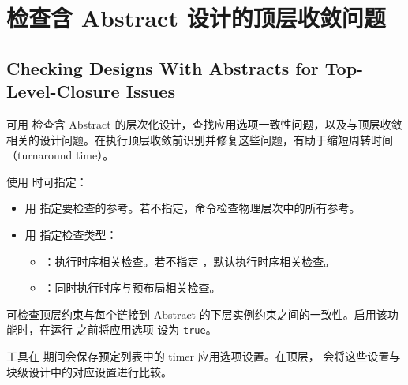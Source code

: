 \section{检查含 Abstract 设计的顶层收敛问题}
\subsection*{Checking Designs With Abstracts for Top-Level-Closure Issues}

可用  检查含 Abstract 的层次化设计，查找应用选项一致性问题，以及与顶层收敛相关的设计问题。在执行顶层收敛前识别并修复这些问题，有助于缩短周转时间（turnaround time）。

使用  时可指定：
\begin{itemize}
  \item 用  指定要检查的参考。若不指定，命令检查物理层次中的所有参考。
  \item 用  指定检查类型：
  \begin{itemize}
    \item {}：执行时序相关检查。若不指定 ，默认执行时序相关检查。
    \item {}：同时执行时序与预布局相关检查。
  \end{itemize}
\end{itemize}

 可检查顶层约束与每个链接到 Abstract 的下层实例约束之间的一致性。启用该功能时，在运行  之前将应用选项  设为 \texttt{true}。

工具在  期间会保存预定列表中的 timer 应用选项设置。在顶层， 会将这些设置与块级设计中的对应设置进行比较。

